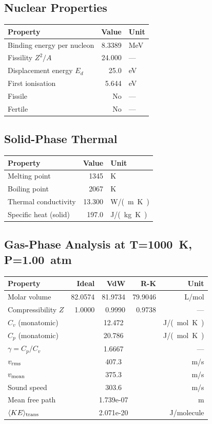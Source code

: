 \documentclass[11pt,a4paper]{article}
\begin{document}
\subsection{Nuclear Properties}
\begin{tabular}{lrl}
  \toprule
  Property & Value & Unit \\
  \midrule
  Binding energy per nucleon & 8.3389 & \si{MeV} \\
  Fissility $Z^2/A$ & 24.000 & --- \\
  Displacement energy $E_d$ & 25.0 & \si{eV} \\
  First ionisation & 5.644 & \si{eV} \\
  Fissile & No & --- \\
  Fertile & No & --- \\
  \bottomrule
\end{tabular}

\subsection{Solid-Phase Thermal}
\begin{tabular}{lrl}
  \toprule
  Property & Value & Unit \\
  \midrule
  Melting point & 1345 & \si{K} \\
  Boiling point & 2067 & \si{K} \\
  Thermal conductivity & 13.300 & \si{W/(m.K)} \\
  Specific heat (solid) & 197.0 & \si{J/(kg.K)} \\
  \bottomrule
\end{tabular}

\subsection{Gas-Phase Analysis at T=\SI{1000}{K}, P=\SI{1.00}{atm}}
\begin{tabular}{lrrrr}
  \toprule
  Property & Ideal & VdW & R-K & Unit \\
  \midrule
  Molar volume & 82.0574 & 81.9734 & 79.9046 & \si{L/mol} \\
  Compressibility $Z$ & 1.0000 & 0.9990 & 0.9738 & --- \\
  \midrule
  $C_v$ (monatomic) & \multicolumn{3}{c}{12.472} & \si{J/(mol.K)} \\
  $C_p$ (monatomic) & \multicolumn{3}{c}{20.786} & \si{J/(mol.K)} \\
  $\gamma = C_p/C_v$ & \multicolumn{3}{c}{1.6667} & --- \\
  $v_{\rm rms}$ & \multicolumn{3}{c}{407.3} & \si{m/s} \\
  $v_{\rm mean}$ & \multicolumn{3}{c}{375.3} & \si{m/s} \\
  Sound speed & \multicolumn{3}{c}{303.6} & \si{m/s} \\
  Mean free path & \multicolumn{3}{c}{1.739e-07} & \si{m} \\
  $\langle KE \rangle_{\rm trans}$ & \multicolumn{3}{c}{2.071e-20} & \si{J/molecule} \\
  \bottomrule
\end{tabular}
\end{document}
